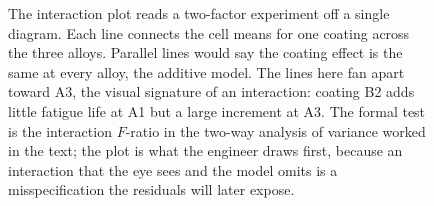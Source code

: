 \begin{figure}[htbp]
\centering
{}
\caption[Interaction plot for a two-factor fatigue experiment]{The
interaction plot reads a two-factor experiment off a single diagram.
Each line connects the cell means for one coating across the three
alloys. Parallel lines would say the coating effect is the same at
every alloy, the additive model. The lines here fan apart toward A3,
the visual signature of an interaction: coating B2 adds little fatigue
life at A1 but a large increment at A3. The formal test is the
interaction $F$-ratio in the two-way analysis of variance worked in
the text; the plot is what the engineer draws first, because an
interaction that the eye sees and the model omits is a
misspecification the residuals will later expose.}
\label{fig:vol02:ch14:twoway-interaction}
\end{figure}
